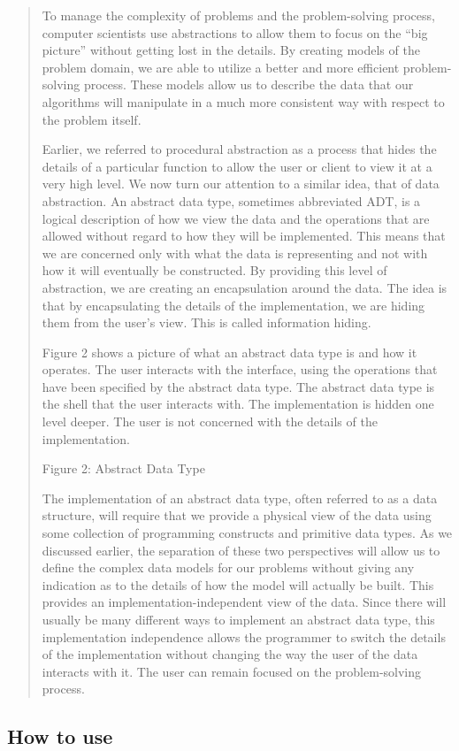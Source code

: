 \begin{quotation}
	
	To manage the complexity of problems and the problem-solving process, computer scientists use abstractions to allow them to focus on the “big picture” without getting lost in the details. By creating models of the problem domain, we are able to utilize a better and more efficient problem-solving process. These models allow us to describe the data that our algorithms will manipulate in a much more consistent way with respect to the problem itself.
	
	Earlier, we referred to procedural abstraction as a process that hides the details of a particular function to allow the user or client to view it at a very high level. We now turn our attention to a similar idea, that of data abstraction. An abstract data type, sometimes abbreviated ADT, is a logical description of how we view the data and the operations that are allowed without regard to how they will be implemented. This means that we are concerned only with what the data is representing and not with how it will eventually be constructed. By providing this level of abstraction, we are creating an encapsulation around the data. The idea is that by encapsulating the details of the implementation, we are hiding them from the user’s view. This is called information hiding.
	
	Figure 2 shows a picture of what an abstract data type is and how it operates. The user interacts with the interface, using the operations that have been specified by the abstract data type. The abstract data type is the shell that the user interacts with. The implementation is hidden one level deeper. The user is not concerned with the details of the implementation.

	
	Figure 2: Abstract Data Type
	
	The implementation of an abstract data type, often referred to as a data structure, will require that we provide a physical view of the data using some collection of programming constructs and primitive data types. As we discussed earlier, the separation of these two perspectives will allow us to define the complex data models for our problems without giving any indication as to the details of how the model will actually be built. This provides an implementation-independent view of the data. Since there will usually be many different ways to implement an abstract data type, this implementation independence allows the programmer to switch the details of the implementation without changing the way the user of the data interacts with it. The user can remain focused on the problem-solving process.

\end{quotation}

\subsection{How to use}



